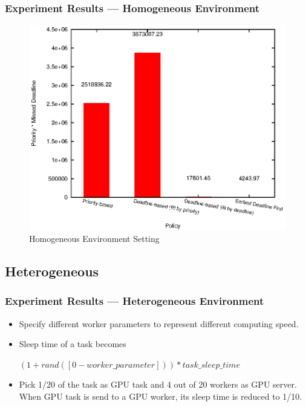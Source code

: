 \begin{frame}
  \frametitle{Experiment Results --- Homogeneous Environment}
  \begin{figure}[htbp]
    \centering
    \includegraphics[width=\textwidth,height=0.7\textheight,keepaspectratio]{figures/homo.eps}
    \caption{Homogeneous Environment Setting}
    \label{fig:homo-exp}
  \end{figure}
\end{frame}

\subsection{Heterogeneous}
\begin{frame}
  \frametitle{Experiment Results --- Heterogeneous Environment}
  \begin{itemize}
    \item Specify different worker parameters to represent different
      computing speed.
    \item Sleep time of a task becomes
      \begin{center}\begin{minipage}{.8\textwidth}
        \begin{exampleblock}{}
          \centering
          $\left(1 + rand([0-worker\_parameter])\right)*task\_sleep\_time$
        \end{exampleblock}
      \end{minipage}\end{center}
    \item Pick 1/20 of the task as GPU task and 4 out of 20 workers as
      GPU server.  When GPU task is send to a GPU worker, its sleep
      time is reduced to 1/10.
  \end{itemize}
\end{frame}

